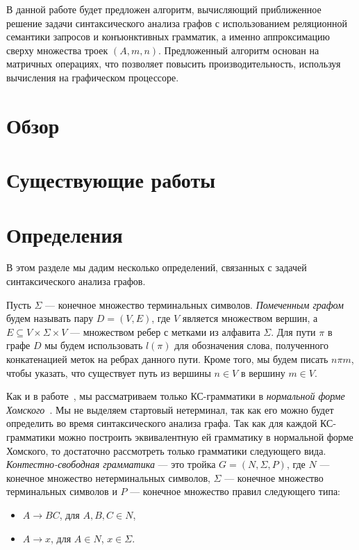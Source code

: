 \documentclass [a4paper] {article}
\begin{document}
	В данной работе будет предложен алгоритм, вычисляющий приближенное решение задачи синтаксического анализа графов с использованием реляционной семантики запросов и конъюнктивных грамматик, а именно аппроксимацию сверху множества троек $(A, m, n)$. Предложенный алгоритм основан на матричных операциях, что позволяет повысить производительность, используя вычисления на графическом процессоре.
	\section{Обзор}
	\section{Существующие работы}
	\section{Определения}
	В этом разделе мы дадим несколько определений, связанных с задачей синтаксического анализа графов.
	 
	Пусть $\Sigma$ --- конечное множество терминальных символов. \textit{Помеченным графом} будем называть пару $D = (V, E)$, где $V$ является множеством вершин, а $E \subseteq V \times \Sigma \times V$ --- множеством ребер с метками из алфавита $\Sigma$. Для пути $\pi$ в графе $D$ мы будем использовать $l(\pi)$ для обозначения слова, полученного конкатенацией меток на ребрах данного пути. Кроме того, мы будем писать $n \pi m$, чтобы указать, что существует путь из вершины $n \in V$ в вершину $m \in V$.
	
	Как и в работе~\cite{hellingsRelational}, мы рассматриваем только КС-грамматики в \textit{нормальной форме Хомского}~\cite{chomsky}. Мы не выделяем стартовый нетерминал, так как его можно будет определить во время синтаксического анализа графа. Так как для каждой КС-грамматики можно построить эквивалентную ей грамматику в нормальной форме Хомского, то достаточно рассмотреть только грамматики следующего вида. \textit{Контестно-свободная грамматика} --- это тройка $G = (N, \Sigma, P)$, где $N$ --- конечное множество нетерминальных символов, $\Sigma$ --- конечное множество терминальных символов и $P$ --- конечное множество правил следующего типа:
	
	\begin{itemize}
		\item $A \rightarrow B C$, для $A,B,C \in N$,
		\item $A \rightarrow x$, для $A \in N$, $x \in \Sigma$.   
	\end{itemize}
\end{document}
